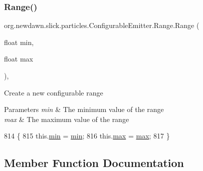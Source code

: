 \subsubsection{\texorpdfstring{Range()}{Range()}}
{\footnotesize\ttfamily org.\+newdawn.\+slick.\+particles.\+Configurable\+Emitter.\+Range.\+Range (\begin{DoxyParamCaption}\item[{float}]{min,  }\item[{float}]{max }\end{DoxyParamCaption})\hspace{0.3cm}{\ttfamily [inline]}, {\ttfamily [private]}}

Create a new configurable range


\begin{DoxyParams}{Parameters}
{\em min} & The minimum value of the range \\
\hline
{\em max} & The maximum value of the range \\
\hline
\end{DoxyParams}

\begin{DoxyCode}
814                                             \{
815             this.\mbox{\hyperlink{classorg_1_1newdawn_1_1slick_1_1particles_1_1_configurable_emitter_1_1_range_a863382f93996d8d07cea741bea1fb9a9}{min}} = \mbox{\hyperlink{classorg_1_1newdawn_1_1slick_1_1particles_1_1_configurable_emitter_1_1_range_a863382f93996d8d07cea741bea1fb9a9}{min}};
816             this.\mbox{\hyperlink{classorg_1_1newdawn_1_1slick_1_1particles_1_1_configurable_emitter_1_1_range_a6950c49934d7424d5ab449b3b3256ec0}{max}} = \mbox{\hyperlink{classorg_1_1newdawn_1_1slick_1_1particles_1_1_configurable_emitter_1_1_range_a6950c49934d7424d5ab449b3b3256ec0}{max}};
817         \}
\end{DoxyCode}


\subsection{Member Function Documentation}
\mbox{\label{classorg_1_1newdawn_1_1slick_1_1particles_1_1_configurable_emitter_1_1_range_ae716224b766ab80d7008f6ce899277a7}} 
